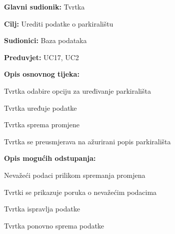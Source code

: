 \noindent {}
\begin{packed_item}
	
	\item \textbf{Glavni sudionik:} Tvrtka
	\item \textbf{Cilj:} Urediti podatke o parkiralištu
	\item \textbf{Sudionici:} Baza podataka
	\item \textbf{Preduvjet:} UC17, UC2
	\item \textbf{Opis osnovnog tijeka:}
	
	\item[] \begin{packed_enum}
		
		\item Tvrtka odabire opciju za uređivanje parkirališta
		\item Tvrtka uređuje podatke
		\item Tvrtka sprema promjene
		\item Tvrtka se preusmjerava na ažurirani popis parkirališta
	
	\end{packed_enum}
	
	\item  \textbf{Opis mogućih odstupanja:}
	
	\item[] \begin{packed_item}
		
		\item[2.a] Nevažeći podaci prilikom spremanja promjena
		\item[] \begin{packed_enum}
			
			\item Tvrtki se prikazuje poruka o nevažećim podacima
			\item Tvrtka ispravlja podatke
			\item Tvrtka ponovno sprema podatke
			
		\end{packed_enum}
		
	\end{packed_item}

\end{packed_item}

